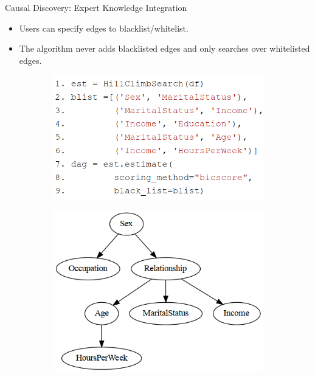 \documentclass{beamer}
\begin{document}
\begin{frame}{Causal Discovery: Expert Knowledge Integration}
	\begin{itemize}
		\item Users can specify edges to blacklist/whitelist.
		\item The algorithm never adds blacklisted edges and only
			searches over whitelisted edges.
	\end{itemize}
	\vfill
	\begin{figure}
		\begin{subfigure}{0.5 \textwidth}
			\centering
			\includegraphics[scale=0.28]{imgs/adult_blacklist.png}
		\end{subfigure}%
		\begin{subfigure}{0.5 \textwidth}
			\centering
			\includegraphics[scale=0.3]{imgs/adult_bic_blacklist.png}
		\end{subfigure}
	\end{figure}
\end{frame}
\end{document}

